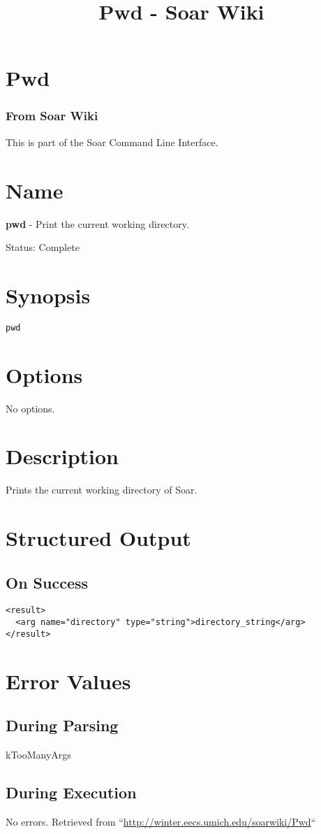 \documentclass[10pt]{article}
\title{Pwd - Soar Wiki}
\begin{document}
\section*{Pwd}
\subsubsection*{From Soar Wiki}


 This is part of the Soar Command Line Interface. 
\section*{ Name }


 \textbf{pwd}
 - Print the current working directory. 


 Status: Complete
\section*{ Synopsis }
\begin{verbatim}
pwd

\end{verbatim}
\section*{ Options }


 No options. 
\section*{ Description }


 Prints the current working directory of Soar. 
\section*{ Structured Output }
\subsection*{ On Success }
\begin{verbatim}
<result>
  <arg name="directory" type="string">directory_string</arg>
</result>

\end{verbatim}
\section*{ Error Values }
\subsection*{ During Parsing }


 kTooManyArgs
\subsection*{ During Execution }


 No errors.  Retrieved from ``\url{http://winter.eecs.umich.edu/soarwiki/Pwd}``
\end{document}
